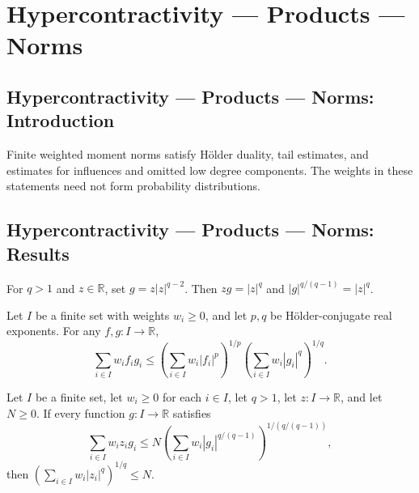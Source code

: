 \section{Hypercontractivity --- Products --- Norms}
\subsection*{Hypercontractivity --- Products --- Norms: Introduction}
Finite weighted moment norms satisfy Hölder duality, tail estimates, and estimates for influences and omitted low degree components. The weights in these statements need not form probability distributions.

\subsection*{Hypercontractivity --- Products --- Norms: Results}

\begin{theorem}
\leanok
{}
For $q>1$ and $z\in\mathbb R$, set $g=z|z|^{q-2}$. Then $zg=|z|^q$ and
$|g|^{q/(q-1)}=|z|^q$.
\end{theorem}

\begin{theorem}
\leanok
{}
Let $I$ be a finite set with weights $w_i\ge0$, and let $p,q$ be Hölder-conjugate real
exponents. For any $f,g:I\to\mathbb R$,
\[
\sum_{i\in I}w_i f_i g_i\le\left(\sum_{i\in I}w_i|f_i|^p\right)^{1/p}\left(\sum_{i\in
I}w_i|g_i|^q\right)^{1/q}.
\]
\end{theorem}

\begin{theorem}
\leanok
{}
Let $I$ be a finite set, let $w_i\ge 0$ for each $i\in I$, let $q>1$, let $z:I\to\mathbb
R$, and let $N\ge 0$. If every function $g:I\to\mathbb R$ satisfies
\[
\sum_{i\in I}w_i z_i g_i\le N\left(\sum_{i\in I}w_i|g_i|^{q/(q-1)}\right)^{1/(q/(q-1))},
\]
then $\left(\sum_{i\in I}w_i|z_i|^q\right)^{1/q}\le N$.
\end{theorem}

